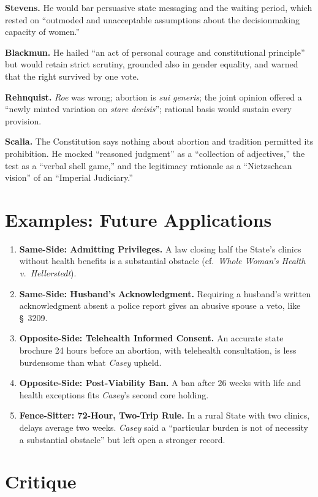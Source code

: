 \documentclass[12pt]{article}
\begin{document}
\textbf{Stevens.} He would bar persuasive state messaging and the waiting period, which rested on ``outmoded and unacceptable assumptions about the decisionmaking capacity of women.''

\textbf{Blackmun.} He hailed ``an act of personal courage and constitutional principle'' but would retain strict scrutiny, grounded also in gender equality, and warned that the right survived by one vote.

\textbf{Rehnquist.} \textit{Roe} was wrong; abortion is \textit{sui generis}; the joint opinion offered a ``newly minted variation on \textit{stare decisis}''; rational basis would sustain every provision.

\textbf{Scalia.} The Constitution says nothing about abortion and tradition permitted its prohibition. He mocked ``reasoned judgment'' as a ``collection of adjectives,'' the test as a ``verbal shell game,'' and the legitimacy rationale as a ``Nietzschean vision'' of an ``Imperial Judiciary.''

\section{Examples: Future Applications}

\begin{enumerate}
\item \textbf{Same-Side: Admitting Privileges.} A law closing half the State's clinics without health benefits is a substantial obstacle (cf.\ \textit{Whole Woman's Health v.\ Hellerstedt}).
\item \textbf{Same-Side: Husband's Acknowledgment.} Requiring a husband's written acknowledgment absent a police report gives an abusive spouse a veto, like \S\ 3209.
\item \textbf{Opposite-Side: Telehealth Informed Consent.} An accurate state brochure 24 hours before an abortion, with telehealth consultation, is less burdensome than what \textit{Casey} upheld.
\item \textbf{Opposite-Side: Post-Viability Ban.} A ban after 26 weeks with life and health exceptions fits \textit{Casey}'s second core holding.
\item \textbf{Fence-Sitter: 72-Hour, Two-Trip Rule.} In a rural State with two clinics, delays average two weeks. \textit{Casey} said a ``particular burden is not of necessity a substantial obstacle'' but left open a stronger record.
\end{enumerate}

\section{Critique}
\end{document}

